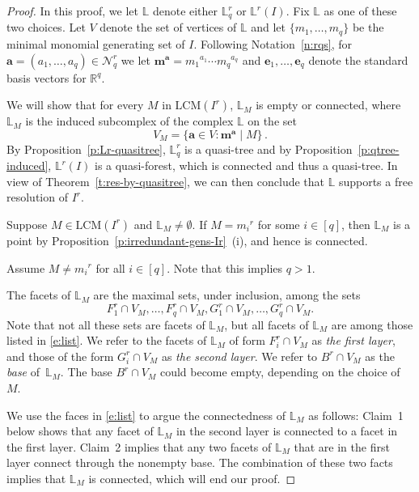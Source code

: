 \documentclass[11pt]{article}
\theoremstyle{definition}
\numberwithin{equation}{section}
\newcommand{\Nrq}{\mathcal{N}^r_q}
\newcommand{\st}{\colon}
\newcommand{\LCM}{\mathrm{LCM}}
\newcommand{\Lrq}{\mathbb{L}^r_q}
\newcommand{\Lr}{\mathbb{L}^r}
\newcommand{\ba}{\mathbf{a}}
\newcommand{\be}{\mathbf{e}}
\newcommand{\bma}{\mathbf{m}^\ba}
\begin{document}
\newcommand{\Ll}{\mathbb{L}}

\begin{proof} 
In this proof, we let $\Ll$  denote either $\Lrq$ or  $\Lr(I)$.  Fix $\Ll$ as one of these two choices. Let $V$ denote the set of vertices of $\Ll$ and let
$\{m_1,\ldots,m_q\}$ be the minimal monomial generating set of $I$.
Following Notation~\ref{n:rqs}, for $\ba = (a_1, \ldots, a_q) \in
\Nrq$ we let $\bma = {m_1}^{a_1} \cdots {m_q}^{a_q}$ and $\be_1, \ldots,
\be_q$ denote the standard basis vectors for $\mathbb R^q$.

We will show that for every $M$ in $\LCM(I^r)$, ${\Ll}_M$ is empty or connected, where ${\Ll}_M$ is the induced subcomplex of the complex $\Ll$ on
  the set 
$$V_M=\{\ba \in V \st \bma \mid M\}\,.$$ 
By Proposition~\ref{p:Lr-quasitree}, $\Lrq$ is a quasi-tree and by Proposition~\ref{p:qtree-induced}, $\Lr(I)$ is a quasi-forest, which is connected and thus a quasi-tree.  In view of Theorem~\ref{t:res-by-quasitree}, we can then conclude that $\Ll$ supports a free resolution of $I^r$.

Suppose $M \in \LCM(I^r)$ and ${\Ll}_M\neq \emptyset$. If $M = {m_i}^r$ for some $i\in [q]$, then
${\Ll}_M$ is a point by Proposition~\ref{p:irredundant-gens-Ir}~\textup{(}i\textup{)}, and
hence is connected.

Assume $M\ne
{m_i}^r$ for all $i\in [q]$. Note that this implies $q>1$.

The facets of ${\Ll}_M$ are the maximal sets, under inclusion, among the
sets 
\begin{equation}
\label{e:list}
F^r_1\cap V_M, \ldots, F^r_{q}\cap V_M, G^r_1\cap V_M,  \ldots, 
G^r_{q}\cap V_M.
\end{equation}
Note that not all these sets  are facets of ${\Ll}_M$, but  all
facets of ${\Ll}_M$ are among those listed in \eqref{e:list}.
We refer to the facets of ${\Ll}_M$ of form
$F^r_i \cap V_M$ as {\it the first layer},  and those of the form $G^r_i \cap V_M$ as {\it the second layer}. We refer to $B^r\cap
V_M$ as the {\it base} of~${\Ll}_M$. The base $B^r\cap V_M$
could become empty, depending on the choice of $M$.


We use the faces in \eqref{e:list} to argue the connectedness of
${\Ll}_M$ as follows: Claim~1 below shows that any facet of
${\Ll}_M$ in the second layer is connected to a facet in the first
layer. Claim~2 implies that any two facets of ${\Ll}_M$ that are in
the first layer connect through the nonempty base.  The combination of
these two facts implies that ${\Ll}_M$ is connected, which will end
our proof.


\end{proof}
\end{document}
